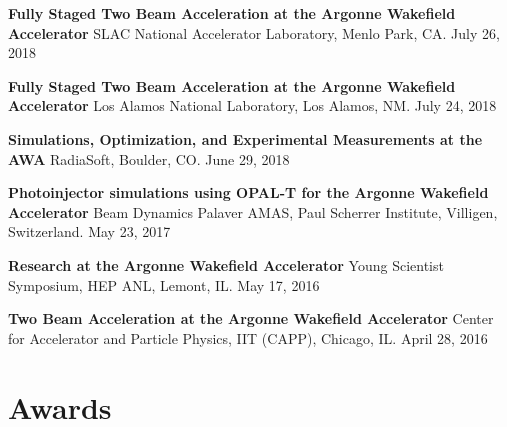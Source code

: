 \documentclass[11pt,a4paper,sans]{moderncv}        %
\begin{document}
\textbf{Fully Staged Two Beam Acceleration at the Argonne Wakefield Accelerator}\newline
SLAC National Accelerator Laboratory, Menlo Park, CA. July 26, 2018 
\vspace{0.3em}

\textbf{Fully Staged Two Beam Acceleration at the Argonne Wakefield Accelerator}\newline
Los Alamos National Laboratory, Los Alamos, NM. July 24, 2018 
\vspace{0.3em}

\textbf{Simulations, Optimization, and Experimental Measurements at the AWA}\newline
RadiaSoft, Boulder, CO. June 29, 2018 
\vspace{0.3em}

\textbf{Photoinjector simulations using OPAL-T for the Argonne Wakefield Accelerator}\newline
Beam Dynamics Palaver AMAS, Paul Scherrer Institute, Villigen, Switzerland. May 23, 2017 
\vspace{0.3em}

\textbf{Research at the Argonne Wakefield Accelerator}\newline
Young Scientist Symposium, HEP ANL, Lemont, IL. May 17, 2016 
\vspace{0.3em}

\textbf{Two Beam Acceleration at the Argonne Wakefield Accelerator}\newline
Center for Accelerator and Particle Physics, IIT (CAPP), Chicago, IL. April 28, 2016 

\section{Awards}


\end{document}
